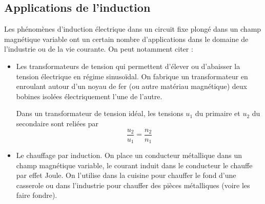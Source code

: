 \documentclass{cours}
\begin{document}
\subsection{Applications de l'induction}%
\label{sub:applications}
Les phénomènes d'induction électrique dans un circuit fixe plongé dans un champ magnétique variable ont un certain nombre d'applications dans le domaine de l'industrie ou de la vie courante. On peut notamment citer :
\begin{itemize}
  \item Les transformateurs de tension qui permettent d'élever ou d'abaisser la tension électrique en régime sinusoïdal. On fabrique un transformateur en enroulant autour d'un noyau de fer (ou autre matériau magnétique) deux bobines isolées électriquement l'une de l'autre.
\begin{center}
\end{center}
Dans un transformateur de tension idéal, les tensions $u_1$ du primaire et $u_2$ du secondaire sont reliées par 
\begin{equation}
  \frac{u_2}{u_1} = \frac{n_2}{n_1}
\end{equation}

\item Le chauffage par induction. On place un conducteur métallique dans un champ magnétique variable, le courant induit dans le conducteur le chauffe par effet Joule. On l'utilise dans la cuisine pour chauffer le fond d'une casserole ou dans l'industrie pour chauffer des pièces métalliques (voire les faire fondre).


\end{itemize}
\end{document}
